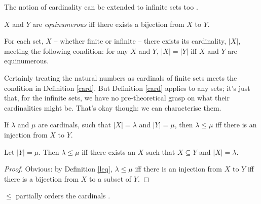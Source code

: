 The notion of cardinality can be extended to infinite sets too \citep[chs. 3, 6]{macsetthl}. \begin{definition}[Equinumerosity]
	$X$ and $Y$ are \emph{equinumerous} iff there exists a bijection from $X$ to $Y$.
\end{definition}
\begin{definition}[Cardinality]\label{card}
	For each set, $X$ – whether finite or infinite – there exists its cardinality, $|X|$, meeting the following condition: for any $X$ and $Y$, $|X|=|Y|$ iff $X$ and $Y$ are equinumerous.
\end{definition}
Certainly treating the natural numbers as cardinals of finite sets meets the condition in Definition \ref{card}. But Definition \ref{card} applies to any sets; it's just that, for the infinite sets, we have no pre-theoretical grasp on what their cardinalities might be. That's okay though: we can characterise them. \begin{definition}[$\leq$]\label{leq}
	If $\lambda$ and $\mu$ are cardinals, such that $|X|=\lambda$ and $|Y|=\mu$, then $\lambda \leq \mu$ iff there is an injection from $X$ to $Y$. 
\end{definition}
\begin{theorem}
	Let $|Y|=\mu$. Then $\lambda\leq\mu$ iff there exists an $X$ such that $X \subseteq Y$ and $|X|=\lambda$. \begin{proof}
		Obvious: by Definition \ref{leq}, $\lambda\leq\mu$ iff there is an injection from $X$ to $Y$ iff there is a bijection from $X$ to a subset of $Y$.\label{cardleq}
	\end{proof}
\end{theorem}
\begin{theorem}
	$\leq$ partially orders the cardinals \citep[38–41]{macsetthl}. 
\end{theorem}

